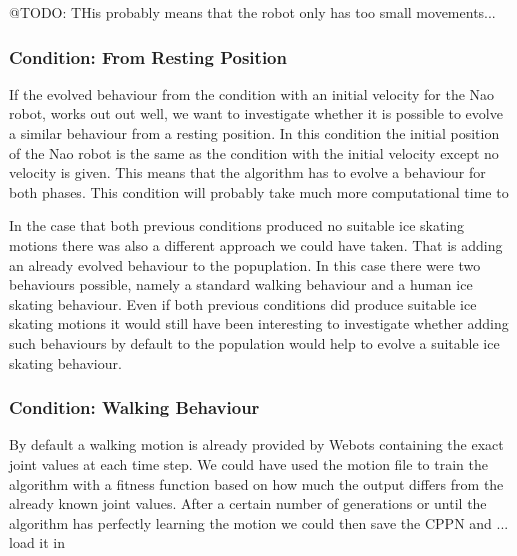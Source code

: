 \documentclass[a4paper,10pt]{article}
\begin{document}
@TODO: THis probably means that the robot only has too small movements...


\subsubsection{Condition: From Resting Position}
If the evolved behaviour from the condition with an initial velocity for the Nao robot, works out out well, we want to investigate whether it is possible to evolve a similar behaviour from a resting position. In this condition the initial position of the Nao robot is the same as the condition with the initial velocity except no velocity is given. This means that the algorithm has to evolve a behaviour for both phases. This condition will probably take much more computational time to 















In the case that both previous conditions produced no suitable ice skating motions there was also a different approach we could have taken. That is adding an already evolved behaviour to the popuplation. In this case there were two behaviours possible, namely a standard walking behaviour and a human ice skating behaviour. Even if both previous conditions did produce suitable ice skating motions it would still have been interesting to investigate whether adding such behaviours by default to the population would help to evolve a suitable ice skating behaviour.

\subsubsection{Condition: Walking Behaviour}
By default a walking motion is already provided by Webots containing the exact joint values at each time step. We could have used the motion file to train the algorithm with a fitness function based on how much the output differs from the already known joint values. After a certain number of generations or until the algorithm has perfectly learning the motion we could then save the CPPN and ... load it in 
\end{document}
